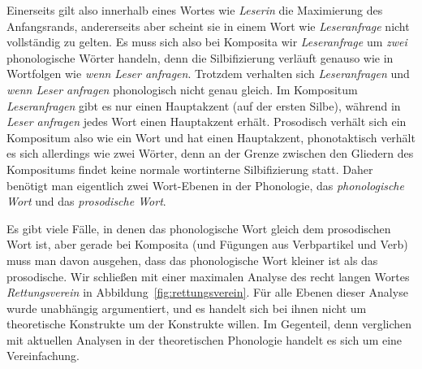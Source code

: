Einerseits gilt also innerhalb eines Wortes wie \textit{Leserin} die Maximierung des Anfangsrands, andererseits aber scheint sie in einem Wort wie \textit{Leseranfrage} nicht vollständig zu gelten.
Es muss sich also bei Komposita wir \textit{Leseranfrage} um \textit{zwei} phonologische Wörter handeln, denn die Silbifizierung verläuft genauso wie in Wortfolgen wie \textit{wenn Leser anfragen}.
Trotzdem verhalten sich \textit{Leseranfragen} und \textit{wenn Leser anfragen} phonologisch nicht genau gleich.
Im Kompositum \textit{Leseranfragen} gibt es nur einen Hauptakzent (auf der ersten Silbe), während in \textit{Leser anfragen} jedes Wort einen Hauptakzent erhält.
Prosodisch verhält sich ein Kompositum also wie ein Wort und hat einen Hauptakzent, phonotaktisch verhält es sich allerdings wie zwei Wörter, denn an der Grenze zwischen den Gliedern des Kompositums findet keine normale wortinterne Silbifizierung statt.
Daher benötigt man eigentlich zwei Wort-Ebenen in der Phonologie, das \textit{phonologische Wort} und das \textit{prosodische Wort}.


Es gibt viele Fälle, in denen das phonologische Wort gleich dem prosodischen Wort ist, aber gerade bei Komposita (und \zB Fügungen aus Verbpartikel und Verb) muss man davon ausgehen, dass das phonologische Wort kleiner ist als das prosodische.
Wir schließen mit einer maximalen Analyse des recht langen Wortes \textit{Rettungsverein} in Abbildung~\ref{fig:rettungsverein}.
Für alle Ebenen dieser Analyse wurde unabhängig argumentiert, und es handelt sich bei ihnen nicht um theoretische Konstrukte um der Konstrukte willen.
Im Gegenteil, denn verglichen mit aktuellen Analysen in der theoretischen Phonologie handelt es sich um eine Vereinfachung.


